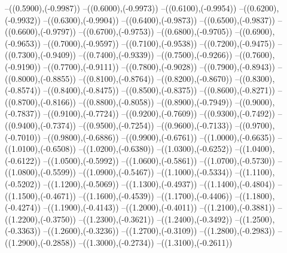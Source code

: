 {	--({\sx*(0.5900)},{\sy*(-0.9987)})
	--({\sx*(0.6000)},{\sy*(-0.9973)})
	--({\sx*(0.6100)},{\sy*(-0.9954)})
	--({\sx*(0.6200)},{\sy*(-0.9932)})
	--({\sx*(0.6300)},{\sy*(-0.9904)})
	--({\sx*(0.6400)},{\sy*(-0.9873)})
	--({\sx*(0.6500)},{\sy*(-0.9837)})
	--({\sx*(0.6600)},{\sy*(-0.9797)})
	--({\sx*(0.6700)},{\sy*(-0.9753)})
	--({\sx*(0.6800)},{\sy*(-0.9705)})
	--({\sx*(0.6900)},{\sy*(-0.9653)})
	--({\sx*(0.7000)},{\sy*(-0.9597)})
	--({\sx*(0.7100)},{\sy*(-0.9538)})
	--({\sx*(0.7200)},{\sy*(-0.9475)})
	--({\sx*(0.7300)},{\sy*(-0.9409)})
	--({\sx*(0.7400)},{\sy*(-0.9339)})
	--({\sx*(0.7500)},{\sy*(-0.9266)})
	--({\sx*(0.7600)},{\sy*(-0.9190)})
	--({\sx*(0.7700)},{\sy*(-0.9111)})
	--({\sx*(0.7800)},{\sy*(-0.9028)})
	--({\sx*(0.7900)},{\sy*(-0.8943)})
	--({\sx*(0.8000)},{\sy*(-0.8855)})
	--({\sx*(0.8100)},{\sy*(-0.8764)})
	--({\sx*(0.8200)},{\sy*(-0.8670)})
	--({\sx*(0.8300)},{\sy*(-0.8574)})
	--({\sx*(0.8400)},{\sy*(-0.8475)})
	--({\sx*(0.8500)},{\sy*(-0.8375)})
	--({\sx*(0.8600)},{\sy*(-0.8271)})
	--({\sx*(0.8700)},{\sy*(-0.8166)})
	--({\sx*(0.8800)},{\sy*(-0.8058)})
	--({\sx*(0.8900)},{\sy*(-0.7949)})
	--({\sx*(0.9000)},{\sy*(-0.7837)})
	--({\sx*(0.9100)},{\sy*(-0.7724)})
	--({\sx*(0.9200)},{\sy*(-0.7609)})
	--({\sx*(0.9300)},{\sy*(-0.7492)})
	--({\sx*(0.9400)},{\sy*(-0.7374)})
	--({\sx*(0.9500)},{\sy*(-0.7254)})
	--({\sx*(0.9600)},{\sy*(-0.7133)})
	--({\sx*(0.9700)},{\sy*(-0.7010)})
	--({\sx*(0.9800)},{\sy*(-0.6886)})
	--({\sx*(0.9900)},{\sy*(-0.6761)})
	--({\sx*(1.0000)},{\sy*(-0.6635)})
	--({\sx*(1.0100)},{\sy*(-0.6508)})
	--({\sx*(1.0200)},{\sy*(-0.6380)})
	--({\sx*(1.0300)},{\sy*(-0.6252)})
	--({\sx*(1.0400)},{\sy*(-0.6122)})
	--({\sx*(1.0500)},{\sy*(-0.5992)})
	--({\sx*(1.0600)},{\sy*(-0.5861)})
	--({\sx*(1.0700)},{\sy*(-0.5730)})
	--({\sx*(1.0800)},{\sy*(-0.5599)})
	--({\sx*(1.0900)},{\sy*(-0.5467)})
	--({\sx*(1.1000)},{\sy*(-0.5334)})
	--({\sx*(1.1100)},{\sy*(-0.5202)})
	--({\sx*(1.1200)},{\sy*(-0.5069)})
	--({\sx*(1.1300)},{\sy*(-0.4937)})
	--({\sx*(1.1400)},{\sy*(-0.4804)})
	--({\sx*(1.1500)},{\sy*(-0.4671)})
	--({\sx*(1.1600)},{\sy*(-0.4539)})
	--({\sx*(1.1700)},{\sy*(-0.4406)})
	--({\sx*(1.1800)},{\sy*(-0.4274)})
	--({\sx*(1.1900)},{\sy*(-0.4143)})
	--({\sx*(1.2000)},{\sy*(-0.4011)})
	--({\sx*(1.2100)},{\sy*(-0.3881)})
	--({\sx*(1.2200)},{\sy*(-0.3750)})
	--({\sx*(1.2300)},{\sy*(-0.3621)})
	--({\sx*(1.2400)},{\sy*(-0.3492)})
	--({\sx*(1.2500)},{\sy*(-0.3363)})
	--({\sx*(1.2600)},{\sy*(-0.3236)})
	--({\sx*(1.2700)},{\sy*(-0.3109)})
	--({\sx*(1.2800)},{\sy*(-0.2983)})
	--({\sx*(1.2900)},{\sy*(-0.2858)})
	--({\sx*(1.3000)},{\sy*(-0.2734)})
	--({\sx*(1.3100)},{\sy*(-0.2611)})
}
